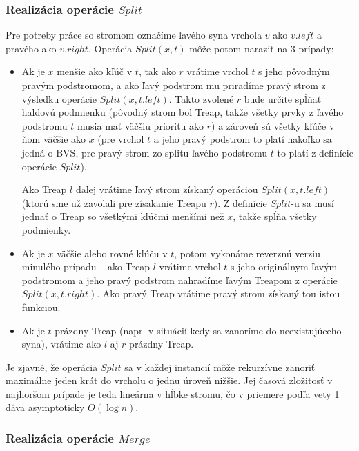 \documentclass[a4paper, 12pt]{article}
\theoremstyle{definition}
\begin{document}
\subsubsection{Realizácia operácie $Split$}

Pre potreby práce so stromom označíme ľavého syna vrchola $v$ ako $v.left$ a
pravého ako $v.right$. Operácia $Split(x, t)$ môže potom naraziť na 3 prípady:
\begin{itemize}
    \item Ak je $x$ menšie ako kľúč v $t$, tak ako $r$ vrátime vrchol $t$ s
        jeho pôvodným pravým podstromom, a ako ľavý podstrom mu priradíme pravý
        strom z výsledku operácie $Split(x, t.left)$. Takto zvolené $r$ bude
        určite spĺňať haldovú podmienku (pôvodný strom bol Treap, takže všetky
        prvky z ľavého podstromu $t$ musia mať väčšiu prioritu ako $r$) a
        zároveň sú všetky kľúče v ňom väčšie ako $x$ (pre vrchol $t$ a jeho
        pravý podstrom to platí nakoľko sa jedná o BVS, pre pravý strom zo
        splitu ľavého podstromu $t$ to platí z definície operácie $Split$).

        Ako Treap $l$ ďalej vrátime ľavý strom získaný
        operáciou $Split(x, t.left)$ (ktorú sme už zavolali pre zísakanie
        Treapu $r$). Z definície $Split$-u sa musí jednať o Treap so všetkými
        kľúčmi menšími než $x$, takže spĺňa všetky podmienky.

    \item Ak je $x$ väčšie alebo rovné kľúču v $t$, potom vykonáme reverznú
        verziu minulého prípadu -- ako Treap $l$ vrátime vrchol $t$ s jeho
        originálnym ľavým podstromom a jeho pravý podstrom nahradíme ľavým
        Treapom z operácie $Split(x, t.right)$. Ako pravý Treap vrátime pravý
        strom získaný tou istou funkciou.

    \item Ak je $t$ prázdny Treap (napr. v situácií kedy sa zanoríme do
        neexistujúceho syna), vrátime ako $l$ aj $r$ prázdny Treap.
\end{itemize}

Je zjavné, že operácia $Split$ sa v každej instancií môže rekurzívne zanoriť
maximálne jeden krát do vrcholu o jednu úroveň nižšie. Jej časová zložitosť v
najhoršom prípade je teda lineárna v hĺbke stromu, čo v priemere podľa vety 1
dáva asymptoticky $O(\log n)$.

\subsubsection{Realizácia operácie $Merge$}
\end{document}
